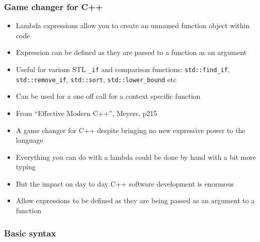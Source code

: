 \subsubsection{Game changer for C++}\label{game-changer-for-c}

\begin{itemize}
\item
  Lambda expressions allow you to create an unnamed function object
  within code
\item
  Expression can be defined as they are passed to a function as an
  argument
\item
  Useful for varions STL \texttt{\_if} and comparison functions:
  \texttt{std::find\_if}, \texttt{std::remove\_if}, \texttt{std::sort},
  \texttt{std::lower\_bound} etc
\item
  Can be used for a one off call for a context specific function
\item
  From ``Effective Modern C++'', Meyers, p215
\item
  A game changer for C++ despite bringing no new expressive power to the
  language
\item
  Everything you can do with a lambda could be done by hand with a bit
  more typing
\item
  But the impact on day to day C++ software development is enormous\\
\item
  Allow expressions to be defined as they are being passed as an
  argument to a function
\end{itemize}

\begin{Shaded}
\begin{Highlighting}[]
                \NormalTok{[](}   \NormalTok{; \});}
\end{Highlighting}
\end{Shaded}

\subsubsection{Basic syntax}\label{basic-syntax}

